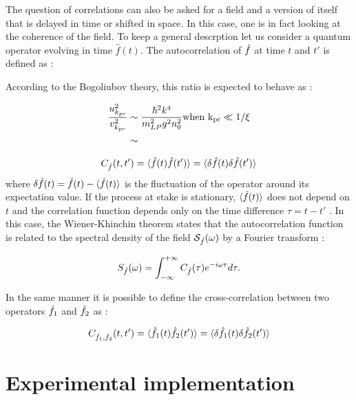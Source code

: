 The question of correlations can also be asked for a field and a version of itself that is delayed in time or shifted in space. In this case, one is in fact looking at the coherence of the field. 
To keep a general descrption let us consider a quantum operator evolving in time $\hat{f}(t)$. The autocorrelation of $\hat{f}$ at time $t$ and $t'$ is defined as :



According to the Bogoliubov theory, this ratio is expected to behave as :

\begin{equation}
    \begin{aligned}
    \dfrac{u_{k_{pr}}^2}{v_{k_{pr}}^2} & \sim \dfrac{\hbar^2k^4}{m_{LP}^2g^2n_0^2} \mathrm{when \ k_{pr} \ll 1/\xi} \\
    &\sim 
    \end{aligned}
\end{equation}





\begin{equation}
    \label{eq:autocorr}
    C_{\hat{f}}(t,t') = \langle \hat{f}(t)\hat{f}(t') \rangle = \langle \delta \hat{f}(t) \delta \hat{f}(t') \rangle
\end{equation}
where $\delta \hat{f}(t) = \hat{f}(t) - \langle \hat{f}(t) \rangle$ is the fluctuation of the operator around its expectation value. If the process at stake 
is stationary, $\langle \hat{f}(t) \rangle$ does not depend on $t$ and the correlation function depends only on the time difference $\tau= t-t'$ \cite{bachor_guide_1998}. In this case,
the Wiener-Khinchin theorem states that the autocorrelation function is related to the spectral density of the field $\mathcal{S}_{\hat{f}}(\omega)$ by a Fourier transform \cite{fabre_houches_97} :

\begin{equation}
    \label{eq:autocorr_spectral}
    S_{\hat{f}}(\omega) = \int_{-\infty}^{+\infty} C_{\hat{f}}(\tau) e^{-i\omega \tau} d\tau.
\end{equation}

In the same manner it is possible to define the cross-correlation between two operators $\hat{f}_1$ and $\hat{f}_2$ as :

\begin{equation}
    \label{eq:crosscorr}
    C_{\hat{f}_1,\hat{f}_2}(t,t') = \langle \hat{f}_1(t)\hat{f}_2(t') \rangle = \langle \delta \hat{f}_1(t) \delta \hat{f}_2(t') \rangle
\end{equation}

\section{Experimental implementation}
\label{sec:exp_impl}




